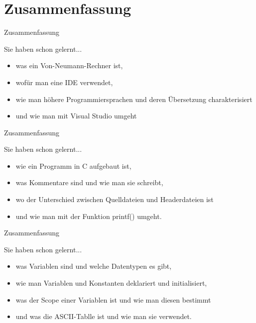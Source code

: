 \documentclass[usenames,dvipsnames,10pt]{beamer}
\begin{document}
    \section{Zusammenfassung}
    \begin{frame}{Zusammenfassung}
        \begin{block}{Sie haben schon gelernt...}
            \begin{itemize}
                \item was ein Von-Neumann-Rechner ist,
                \item wofür man eine IDE verwendet,
                \item wie man höhere Programmiersprachen und deren Übersetzung charakterisiert
                \item und wie man mit Visual Studio umgeht
            \end{itemize}
        \end{block}
    \end{frame}
    \begin{frame}{Zusammenfassung}
        \begin{block}{Sie haben schon gelernt...}
            \begin{itemize}
                \item wie ein Programm in C aufgebaut ist,
                \item was Kommentare sind und wie man sie schreibt,
                \item wo der Unterschied zwischen Quelldateien und Headerdateien ist
                \item und wie man mit der Funktion printf() umgeht.
            \end{itemize}
        \end{block}
    \end{frame}
    \begin{frame}{Zusammenfassung}
        \begin{block}{Sie haben schon gelernt...}
            \begin{itemize}
                \item was Variablen sind und welche Datentypen es gibt,
                \item wie man Variablen und Konstanten deklariert und initialisiert,
                \item was der Scope einer Variablen ist und wie man diesen bestimmt
                \item und was die ASCII-Tablle ist und wie man sie verwendet.
            \end{itemize}
        \end{block}
    \end{frame}
\end{document}
